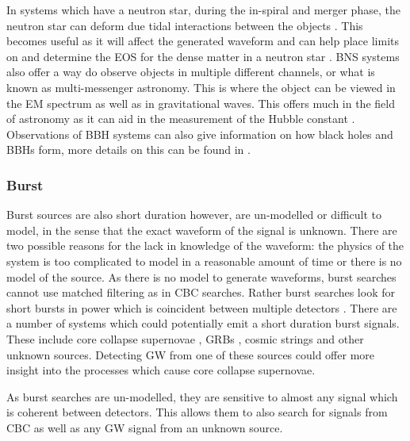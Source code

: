 In systems which have a neutron star, during the in-spiral and merger phase, the neutron star can deform due tidal interactions between the objects \citep{flanagan2008ConstrainingNeutronstar}. 
This becomes useful as it will affect the generated waveform and can help place limits on and determine the \gls{EOS} for the dense matter in a neutron star \citep{harry2018ObservingMeasuring}. %
\gls{BNS} systems also offer a way do observe objects in multiple different channels, or what is known as multi-messenger astronomy. 
This is where the object can be viewed in the \gls{EM} spectrum as well as in gravitational waves.
This offers much in the field of astronomy as it can aid in the measurement of the Hubble constant \citep{theligoscientificcollaborationandthevirgocollaboration2017GravitationalwaveStandard}. 
Observations of \gls{BBH} systems can also give information on how black holes and \glspl{BBH} form, more details on this can be found in \citep{zevin2017ConstrainingFormation,mandel2018MergingStellarmass}.


\subsubsection{\label{sources:transient:burst}Burst}

Burst sources are also short duration however, are un-modelled or difficult to model, in the sense that the exact waveform of the signal is unknown.
There are two possible reasons for the lack in knowledge of the waveform: the physics of the system is too complicated to model in a reasonable amount of time or there is no model of the source.
As there is no model to generate waveforms, burst searches cannot use matched filtering as in \gls{CBC} searches.
Rather burst searches look for short bursts in power which is coincident between multiple detectors \citep{cornish2015BayeswaveBayesian, klimenko2008CoherentMethod}.
There are a number of systems which could potentially emit a short duration burst signals.
These include core collapse supernovae \citep{ott2008GravitationalWave}, \glspl{GRB} \citep{aasi2014SearchGravitational}, cosmic strings \citep{damour2005GravitationalRadiation} and other unknown sources.
Detecting \gls{GW} from one of these sources could offer more insight into the processes which cause core collapse supernovae. 

As burst searches are un-modelled, they are sensitive to almost any signal which is coherent between detectors. 
This allows them to also search for signals from \gls{CBC} as well as any \gls{GW} signal from an unknown source.



